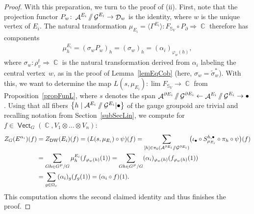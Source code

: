 \documentclass[pdftex]{sigma}
\DeclareMathOperator{\vect}{\mathsf{Vect}}
\DeclareMathOperator{\C}{\mathbb{C}}
\DeclareMathOperator{\cala}{\mathcal{A}}
\DeclareMathOperator{\cald}{\mathcal{D}}
\DeclareMathOperator{\calg}{\mathcal{G}}
\newcommand{\sslash}{\mathbin{/\mkern-6mu/}}
\numberwithin{equation}{section}
\theoremstyle{definition}
\begin{document}
\begin{proof}
 With this preparation, we turn to the proof of (ii). First, note that the projection functor $P_w\colon \cala^{E_i} \sslash \calg^{E_i} \rightarrow \cald_w$ is the identity, where $w$ is the unique vertex of $E_i$. The natural transformation $\mu_{E_i} = \bigl\langle \Gamma^{E_i}\bigr\rangle\colon F_{\mathbb{S}_V} \circ P_{\partial} \Rightarrow \C$ therefore has components
 \begin{align*}
 \mu_h^{E_i} = (\sigma_wP_w)_h = (\sigma_w)_h = (\alpha_i)_{\varphi_w(h)},
 \end{align*}
 where $\sigma_w\colon \rho_v^t \Rightarrow \C$ is the natural transformation derived from $\alpha_i$ labeling the central vertex~$w$, as in the proof of Lemma~\ref{lemEqCob} (here, $\sigma_w = \widetilde{\sigma}_w^*$). With this, we want to determine the map $L(s, \mu_{E_i})\colon \lim F_{\mathbb{S}_V} \rightarrow \C$ from Proposition~\ref{propFunL}, where $s$ denotes the span $\cala^{\partial E_i} \sslash \calg^{\partial E_i} \leftarrow \cala^{E_i} \sslash \calg^{E_i} \rightarrow \bullet$. Using that all fibers $\bigl\{h \mid \mathcal{A}^{E_i}\sslash \mathcal{G}^{E_i}|\bullet\bigr\}$ of the gauge groupoid are trivial and recalling notation from Section~\ref{subSecLin}, we compute for $f \in \vect_G(\C, V_1 \otimes \dots \otimes V_n) $:
 \begin{align*}
 Z_G(E^{\alpha_i})(f) &= Z_{\rm DW}(E_i)(f) = (L(s, \mu_{E_i}) \circ \psi)(f) =\sum_{[h] \in \pi_0 (\mathcal{A}^{\partial E_i}\sslash \mathcal{G}^{\partial E_i} )}\bigl(\iota_{\bullet} \circ S_{\mu_{E_i}}^{h, \bullet} \circ \pi_h \circ \psi\bigr)(f) \\ &= \sum_{Gh \in G^P/G}\mu_h^{E_i}(f_{\varphi_w(h)}(1)) = \sum_{Gh \in G^P/G} (\alpha_i)_{\varphi_w(h)}(f_{\varphi_w(h)}(1)) \\
 &= \sum_{g \in \Omega_v} (\alpha_i)_g (f_g (1)) = (\alpha_i \circ f)(1).
 \end{align*}
 This computation shows the second claimed identity and thus finishes the proof.
\end{proof}
\end{document}
